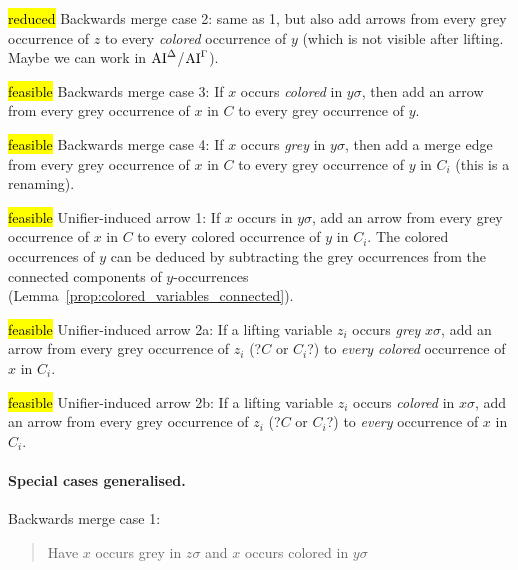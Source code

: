\documentclass[,%
	paper=a4,%
	DIV12, %
	twoside=false,%
	liststotoc,
	bibtotoc,
	draft=false,%
	numbers=noendperiod
]{scrartcl}
\begin{document}
\begin{enumerate}
		\hl{reduced} Backwards merge case 2: 
		same as 1, but also add arrows from every grey occurrence of $z$ to every \emph{colored} occurrence of $y$ (which is not visible after lifting. Maybe we can work in $\operatorname{AI}^\Delta$/$\operatorname{AI}^\Gamma$).

		\hl{feasible} Backwards merge case 3: 
		If $x$ occurs \emph{colored} in $y\sigma$, then add an arrow from every grey occurrence of $x$ in $C$ to every grey occurrence of $y$.

		\hl{feasible}  Backwards merge case 4: 
		If $x$ occurs \emph{grey} in $y\sigma$, then add a merge edge from every grey occurrence of $x$ in $C$ to every grey occurrence of $y$ in $C_i$ (this is a renaming).

		\hl{feasible} Unifier-induced arrow 1: 
		If $x$ occurs in $y\sigma$, add an arrow from every grey occurrence of $x$ in $C$ to every colored occurrence of $y$ in $C_i$.
		The colored occurrences of $y$ can be deduced by subtracting the grey occurrences from the connected components of $y$-occurrences (Lemma~\ref{prop:colored_variables_connected}). 

		\hl{feasible} Unifier-induced arrow 2a: 
		If a lifting variable $z_i$ occurs \emph{grey} $x\sigma$, add an arrow from every grey occurrence of $z_i$ (?$C$ or $C_i$?) to \emph{every colored} occurrence of $x$ in $C_i$.

		\hl{feasible} Unifier-induced arrow 2b: 
		If a lifting variable $z_i$ occurs \emph{colored} in $x\sigma$, add an arrow from every grey occurrence of $z_i$ (?$C$ or $C_i$?) to \emph{every} occurrence of $x$ in $C_i$.


		
	\paragraph{Special cases generalised.}

	Backwards merge case 1:
	\begin{quote}
		Have $x$ occurs grey in $z\sigma$ and $x$ occurs colored in $y\sigma$


\end{quote}
\end{enumerate}
\end{document}
